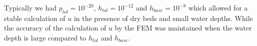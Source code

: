 Typically we had $p_{tol} = 10^{-20}$, $h_{tol} = 10^{-12}$ and $h_{base} = 10^{-8}$ which allowed for a stable calculation of $u$ in the presence of dry beds and small water depths. While the accuracy of the calculation of $u$ by the FEM was maintained when the water depth is large compared to $h_{tol}$ and $h_{base}$.

